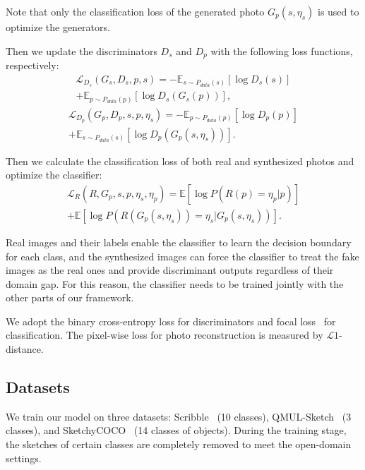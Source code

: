 \documentclass[10pt,twocolumn,letterpaper]{article}
\begin{document}
Note that only the classification loss of the generated photo $G_p(s, \eta_s)$ is used to optimize the generators. 

Then we update the discriminators $D_s$ and $D_p$ with the following loss functions, respectively:
\begin{multline}
    \mathcal{L}_{D_s}(G_s, D_s,p,s) = -\mathbb{E}_{s\sim P_{data}(s)}[\log D_s(s)] \\ +\mathbb{E}_{p\sim P_{data}(p)}[\log D_s(G_s(p))],
\end{multline}
\begin{multline}
    \mathcal{L}_{D_p}(G_p, D_p, s, p,\eta_s) = -\mathbb{E}_{p\sim P_{data}(p)}[\log D_p(p)] \\ +\mathbb{E}_{s\sim P_{data}(s)}[\log D_p(G_p(s, \eta_s))].
\end{multline}

Then we calculate the classification loss of both real and synthesized photos and optimize the classifier:
\begin{multline}
    \mathcal{L}_R(R,G_p,s,p,\eta_s,\eta_p) = \mathbb{E}[\log P(R(p)=\eta_p|p)] \\ + \mathbb{E}[\log P(R(G_p (s, \eta_s))=\eta_s|G_p(s,\eta_s))].
\end{multline}

Real images and their labels enable the classifier to learn the decision boundary for each class, and the synthesized images can force the classifier to treat the fake images as the real ones and provide discriminant outputs regardless of their domain gap. For this reason, the classifier needs to be trained jointly with the other parts of our framework.

We adopt the binary cross-entropy loss for discriminators and focal loss~\cite{lin2017focal} for classification. The pixel-wise loss for photo reconstruction is measured by $\mathcal{L}1$-distance.

\subsection{Datasets}
\label{sec:data}
We train our model on three datasets: Scribble~\cite{ghosh2019interactive} (10 classes), QMUL-Sketch~\cite{yu2016sketch,song2017deep,liu2019unpaired} (3 classes), and SketchyCOCO~\cite{gao2020sketchycoco} (14 classes of objects). During the training stage, the sketches of certain classes are completely removed to meet the open-domain settings.
\end{document}
